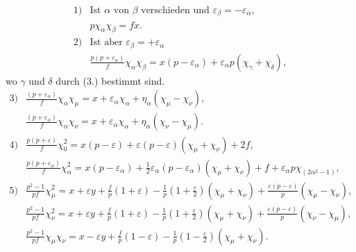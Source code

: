 \documentclass[11pt]{article}
\begin{document}
\[
\begin{array}{ll}
1)&\text{Ist }\alpha\text{ von }\beta\text{ verschieden und }\varepsilon_\beta=-\varepsilon_\alpha,\\[0.25em]
& p\chi_\alpha\chi_\beta=fx.\\[0.65em]
2)&\text{Ist aber }\varepsilon_\beta=+\varepsilon_\alpha\\[0.25em]
& \displaystyle \frac{p(p+\varepsilon_\alpha)}{f}\chi_\alpha\chi_\beta
=x(p-\varepsilon_\alpha)+\varepsilon_\alpha p(\chi_\gamma+\chi_\delta),
\end{array}
\]
wo $\gamma$ und $\delta$ durch (3.) bestimmt sind.
\[
\begin{array}{ll}
3)&\displaystyle \frac{(p+\varepsilon_\alpha)}{f}\chi_\alpha\chi_\mu
=x+\varepsilon_\alpha\chi_\alpha+\eta_\alpha(\chi_\mu-\chi_\nu),\\[0.75em]
&\displaystyle \frac{(p+\varepsilon_\alpha)}{f}\chi_\alpha\chi_\nu
=x+\varepsilon_\alpha\chi_\alpha+\eta_\alpha(\chi_\nu-\chi_\mu).\\[0.75em]
4)&\displaystyle \frac{p(p+\varepsilon)}{f}\chi_0^2
=x(p-\varepsilon)+\varepsilon(p-\varepsilon)(\chi_\mu+\chi_\nu)+2f,\\[0.75em]
&\displaystyle \frac{p(p+\varepsilon_\alpha)}{f}\chi_\alpha^2
=x(p-\varepsilon_\alpha)+\frac12\varepsilon_\alpha(p-\varepsilon_\alpha)(\chi_\mu+\chi_\nu)+f+\varepsilon_\alpha p\chi_{(2\alpha^2-1)},\\[0.75em]
5)&\displaystyle \frac{p^2-1}{pf}\chi_\mu^2
=x+\varepsilon y+\frac{f}{p}(1+\varepsilon)-\frac1p\left(1+\frac{\varepsilon}{2}\right)(\chi_\mu+\chi_\nu)+\frac{\varepsilon(p-\varepsilon)}{p}(\chi_\mu-\chi_\nu),\\[0.75em]
&\displaystyle \frac{p^2-1}{pf}\chi_\nu^2
=x+\varepsilon y+\frac{f}{p}(1+\varepsilon)-\frac1p\left(1+\frac{\varepsilon}{2}\right)(\chi_\mu+\chi_\nu)+\frac{\varepsilon(p-\varepsilon)}{p}(\chi_\nu-\chi_\mu),\\[0.75em]
&\displaystyle \frac{p^2-1}{pf}\chi_\mu\chi_\nu
=x-\varepsilon y+\frac{f}{p}(1-\varepsilon)-\frac1p\left(1-\frac{\varepsilon}{2}\right)(\chi_\mu+\chi_\nu).
\end{array}
\]
\end{document}
